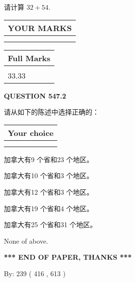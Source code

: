 \documentclass{ctexart}
\begin{document}
  
 
请计算 $ %
32 +  %
54 $.
 

 

 
  
\vspace{0.2in}
  
\noindent\begin{tabular}{|l|}
\hline
 YOUR MARKS  \\
\hline
 \\ 
 \\ 
\hline
\end{tabular}
\hspace{0.05in} \begin{tabular}{|l|}
\hline
 Full Marks  \\
\hline
 \\ 
33.33 \\
\hline
\end{tabular}
{\textbf{\Large{QUESTION
547.2 
}}}
  
  
请从如下的陈述中选择正确的：
  
  
\noindent\hspace{3.0in} \begin{tabular}{|l|}
\hline
Your choice \\
\hline
 \\ 
 \\ 
\hline
\end{tabular}
  
  
 
 
加拿大有9 个省和23 个地区。
 
 
加拿大有10 个省和3 个地区。
 
 
加拿大有12 个省和3 个地区。
 
 
加拿大有19 个省和4 个地区。
 
 
加拿大有25 个省和31 个地区。
 
 
 None of above.
 
 
   
   
 \vspace{0.2in}
 
   
   
   
   
\vspace{1.0in} 
{\textbf{\large{ *** END OF PAPER, THANKS *** }}} 
   
   
\hspace{1.0in} By: 
 239 ( 416 ,  613 )
   
\end{document}
